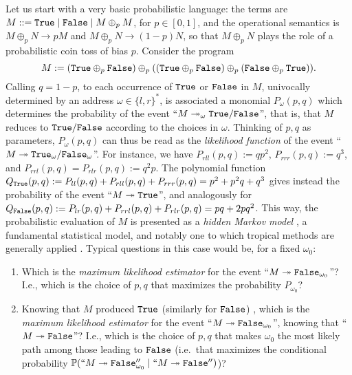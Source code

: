Let us start with a very basic probabilistic language:
the terms are $M::= \mathtt{True} \mid \mathtt{False} \mid M\oplus_p M$, for $p\in[0,1]$, and the operational semantics is $M\oplus_p N\to pM$ and $M\oplus_p N \to (1-p)N$, so that $M\oplus_p N$ plays the role of a probabilistic coin toss of bias $p$.
Consider the program
$$
 M:=(\mathtt{True} \oplus_p\mathtt{False})\oplus_p((\mathtt{True}\oplus_p\mathtt{False})\oplus_p(\mathtt{False}\oplus_p\mathtt{True})).
 $$
 Calling $q=1-p$, to each occurrence of $\mathtt{True}$ or $\mathtt{False}$ in $M$, univocally determined by an address
$\omega\in \{l,r\}^{*}$, is associated a monomial $P_{\omega}(p,q)$ which determines the probability of the event ``$M\twoheadrightarrow_{\omega} \mathtt{True}/\mathtt{False}$'', that is, that $M$ reduces to $\mathtt{True}/\mathtt{False}$ according to the choices in $\omega$.
Thinking of $p,q$ as parameters, $P_{\omega}(p,q)$ can thus be read as the \emph{likelihood function} of the event ``$M\twoheadrightarrow \mathtt{True}_\omega/\mathtt{False}_\omega$''.
 For instance, we have
$P_{rll}(p,q):=qp^2$,
$P_{rrr}(p,q):=q^3$, and 
$P_{rrl}(p,q)=P_{rlr}(p,q):=q^2p$.
The polynomial function $Q_{\mathtt{True}}(p,q):=P_{ll}(p,q)+P_{rll}(p,q)+P_{rrr}(p,q)=p^2+p^2q+q^3$ gives instead the probability of the event ``$M\twoheadrightarrow \mathtt{True}$'', and analogously for $Q_{\mathtt{False}}(p,q):=P_{lr}(p,q)+P_{rrl}(p,q)+P_{rlr}(p,q)=pq+2pq^2$.
This way, the probabilistic evaluation of $M$ is presented as a \emph{hidden Markov model} \cite{Baumr966}, a fundamental statistical model, and notably one to which tropical methods are generally applied \cite{Pachter2ll4}.
Typical questions in this case would be, for a fixed $\omega_0$:
%
\begin{enumerate}
 \item Which is the \emph{maximum likelihood estimator} for the event ``$M\twoheadrightarrow \mathtt{False}_{\omega_0}$''?
 I.e., which is the choice of $p,q$ that maximizes the probability $P_{\omega_0}$?
 \item 
Knowing that $M$ produced $\mathtt{True}$ (similarly for $\mathtt{False}$) , which is the \emph{maximum likelihood estimator} for the event ``$M\twoheadrightarrow \mathtt{False}_{\omega_0}$'', knowing that ``$M\twoheadrightarrow \mathtt{False}$''?
I.e., which is the choice of $p,q$ that makes $\omega_0$ the most likely path among those leading to $\mathtt{False}$ (i.e.\ that maximizes the conditional probability $\mathbb{P}(``M\twoheadrightarrow \mathtt{False}_{\omega_0}'' \mid ``M\twoheadrightarrow \mathtt{False}'')$)?
\end{enumerate}


